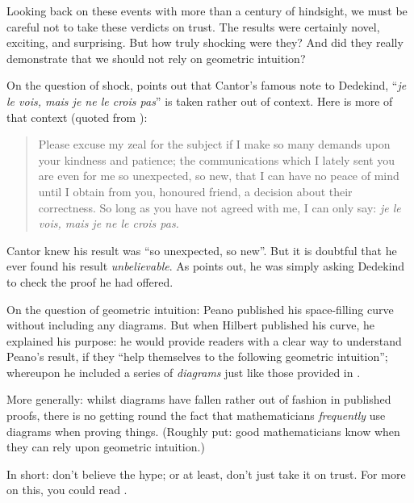 \documentclass[../../../include/open-logic-section]{subfiles}
\begin{document}


Looking back on these events with more than a century of hindsight, we
must be careful not to take these verdicts on trust. The results were
certainly novel, exciting, and surprising. But how truly shocking were
they? And did they really demonstrate that we should not rely on
geometric intuition?

On the question of shock, \citet{Gouvea2011} points out that Cantor's
famous note to Dedekind, ``\emph{je le vois, mais je ne le crois
pas}'' is taken rather out of context. Here is more of that context
(quoted from \citeauthor{Gouvea2011}):
\begin{quote}
Please excuse my zeal for the subject if I make so many demands upon
your kindness and patience; the communications which I lately sent you
are even for me so unexpected, so new, that I can have no peace of
mind until I obtain from you, honoured friend, a decision about their
correctness. So long as you have not agreed with me, I can only say:
\emph{je le vois, mais je ne le crois pas.} 
\end{quote}
Cantor knew his result was ``so unexpected, so new''. But it is
doubtful that he ever found his result \emph{unbelievable}. As
\citeauthor{Gouvea2011} points out, he was simply asking Dedekind to
check the proof he had offered. 

On the question of geometric intuition: Peano published his
space-filling curve without including any diagrams. But when Hilbert
published his curve, he explained his purpose: he would provide
readers with a clear way to understand Peano's result, if they ``help
themselves to the following geometric intuition''; whereupon he
included a series of \emph{diagrams} just like those provided in
. 

More generally: whilst diagrams have fallen rather out of fashion in
published proofs, there is no getting round the fact that
mathematicians \emph{frequently} use diagrams when proving things.
(Roughly put: good mathematicians know when they can rely upon
geometric intuition.)

In short: don't believe the hype; or at least, don't just take it on
trust. For more on this, you could read \citet{Giaquinto2007}.
\end{document}
